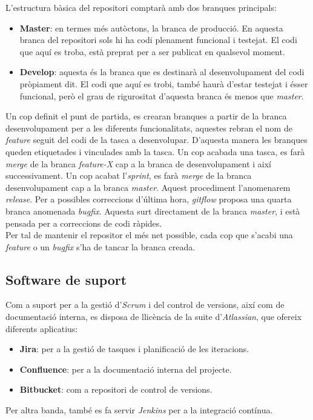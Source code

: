 \newpage
L'estructura bàsica del repositori comptarà amb dos branques principals:
\begin{itemize}
	\item \textbf{Master}: en termes més autòctons, la branca de producció. En aquesta branca del repositori sols hi ha codi plenament funcional i testejat. El codi que aquí es troba, està preprat per a ser publicat en qualsevol moment.
	\item \textbf{Develop}: aquesta és la branca que es destinarà al desenvolupament del codi pròpiament dit. El codi que aquí es trobi, també haurà d'estar testejat i ésser funcional, però el grau de rigurositat d'aquesta branca és menos que \textit{master}.
\end{itemize}
Un cop definit el punt de partida, es crearan branques a partir de la branca desenvolupament per a les diferents funcionalitats, aquestes rebran el nom de \textit{feature} seguit del codi de la tasca a desenvolupar. D'aquesta manera les branques queden etiquetades i vinculades amb la tasca.
\newline Un cop acabada una tasca, es farà \textit{merge} de la branca \textit{feature-X} cap a la branca de desenvolupament i així successivament.
\newline Un cop acabat l'\textit{sprint}, es farà \textit{merge} de la branca desenvolupament cap a la branca \textit{master}. Aquest procediment l'anomenarem \textit{release}.
\newline Per a possibles correccions d'última hora, \textit{gitflow} proposa una quarta branca anomenada \textit{bugfix}. Aquesta surt directament de la branca \textit{master}, i està pensada per a correccions de codi ràpides.\\
Per tal de mantenir el repositor el més net possible, cada cop que s'acabi una \textit{feature} o un \textit{bugfix} s'ha de tancar la branca creada.

\subsection{Software de suport}
Com a suport per a la gestió d'\textit{Scrum}\cite{scrum} i del control de versions, així com de documentació interna, es disposa de llicència de la suite d'\textit{Atlassian}\cite{atlassian}, que ofereix diferents aplicatius:
\begin{itemize}
	\item \textbf{Jira}: per a la gestió de tasques i planificació de les iteracions.
	\item \textbf{Confluence}: per a la documentació interna del projecte.
	\item \textbf{Bitbucket}: com a repositori de control de versions.
\end{itemize}
Per altra banda, també es fa servir \textit{Jenkins}\cite{jenkins} per a la integració contínua.

